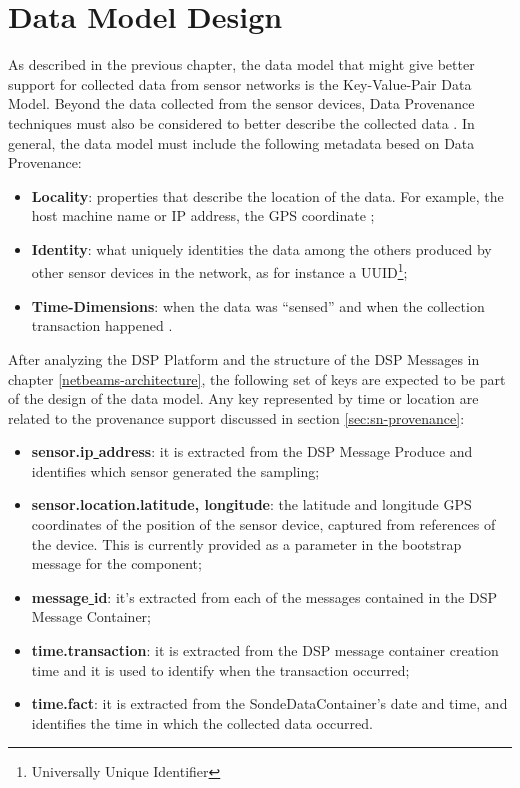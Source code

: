 \section{Data Model Design}
\label{sec:dsp-persistence-data-model}

As described in the previous chapter, the data model that might give better
support for collected data from sensor networks is the Key-Value-Pair Data
Model. Beyond the data collected from the sensor devices, Data Provenance 
techniques must also be considered to better describe the collected data
\cite{sn-provenance}. In general, the data model must include the following
metadata besed on Data Provenance:

\begin{itemize}
  \item \textbf{Locality}: properties that describe the location of the data.
  For example, the host machine name or IP address, the GPS coordinate
  \cite{gps};
  \item \textbf{Identity}: what uniquely identities the data among the others
  produced by other sensor devices in the network, as for instance a
  UUID\footnote{Universally Unique Identifier};
  \item \textbf{Time-Dimensions}: when the data was ``sensed''
  \cite{db-provenance} and when the collection transaction happened
  \cite{sn-time-series}.
\end{itemize}

After analyzing the DSP Platform and the structure of the DSP Messages in
chapter \ref{netbeams-architecture}, the following set of keys are expected to
be part of the design of the data model. Any key represented by time or
location are related to the provenance support discussed in section
\ref{sec:sn-provenance}:

\begin{itemize}
  \item \textbf{sensor.ip\underline{ }address}: it is extracted
  from the DSP Message Produce and identifies which sensor generated the sampling;
  \item \textbf{sensor.location.latitude, longitude}: the latitude and
  longitude GPS coordinates of the position of the sensor device, captured from
  references of the device. This is currently provided as a parameter in the
  bootstrap message for the component;
  \item \textbf{message\underline{ }id}: it's extracted from each of the messages contained
  in the DSP Message Container;
  \item \textbf{time.transaction}: it is extracted from the DSP
  message container creation time and it is used to identify when the transaction occurred;
  \item \textbf{time.fact}: it is extracted from the
  SondeDataContainer's date and time, and identifies the time in which the
  collected data occurred.
\end{itemize}

